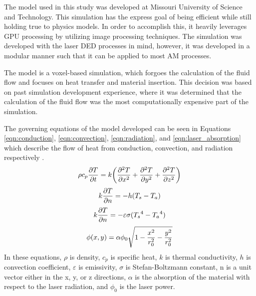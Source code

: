 \label{model_description}

The model used in this study was developed at Missouri University of Science and Technology.
This simulation has the express goal of being efficient while still holding true to physics models.  In order to accomplish this, it heavily leverages GPU processing by utilizing image processing techniques.  The simulation was developed with the laser \ac{DED} processes in mind, however, it was developed in a modular manner such that it can be applied to most \ac{AM} processes. 

The model is a voxel-based simulation, which forgoes the calculation of the fluid flow and focuses on heat transfer and material insertion.  This decision was based on past simulation development experience, where it was determined that the calculation of the fluid flow was the most computationally expensive part of the simulation.   

The governing equations of the model developed can be seen in Equations \ref{eqn:conduction}, \ref{eqn:convection}, \ref{eqn:radiation}, and \ref{eqn:laser_absorption} which describe the flow of heat from conduction, convection, and radiation respectively \cite{Han2012}.
	\begin{equation}
	\label{eqn:conduction}
	\centering
	\rho c_p \frac{\partial T}{\partial t}=k \left(\frac{\partial^2 T}{\partial x^2} +\frac{\partial^2 T}{\partial y^2}+\frac{\partial^2 T}{\partial z^2} \right)
	\end{equation}
		\begin{equation}
		\label{eqn:convection}
		\centering
		k \frac{\partial T}{\partial n}=-h (T_s-T_a)
		\end{equation}
			\begin{equation}
			\label{eqn:radiation}
			\centering
			k \frac{\partial T}{\partial n}=-\varepsilon \sigma ({T_s}^4-{T_a}^4)
			\end{equation}
				\begin{equation}
				\label{eqn:laser_absorption}
				\centering
				\phi(x,y) =\alpha \phi_0 \sqrt{1-\frac{x^2}{r_0^2} -\frac{y^2}{r_0^2}}
				\end{equation}
In these equations, $\rho$ is density, $c_p$ is specific heat, $k$ is thermal conductivity, $h$ is convection coefficient, $\varepsilon$ is emissivity, $\sigma$ is Stefan-Boltzmann constant, n is a unit vector either in the x, y, or z directions, $\alpha$ is the absorption of the material with respect to the laser radiation, and $\phi_0$ is the laser power. 

